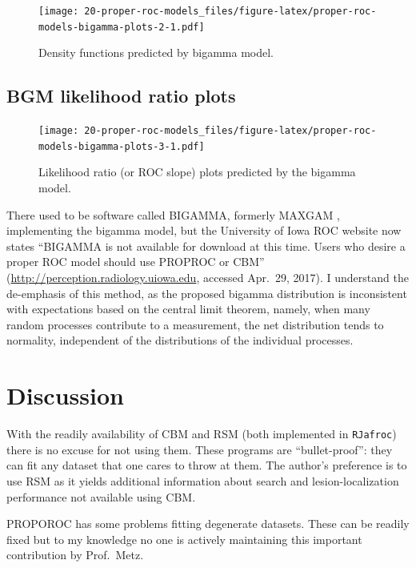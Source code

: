 \documentclass[
]{book}
\begin{document}
\begin{figure}
\centering
\texttt{[image: 20-proper-roc-models\_files/figure-latex/proper-roc-models-bigamma-plots-2-1.pdf]}
\caption{\label{fig:proper-roc-models-bigamma-plots-2}Density functions predicted by bigamma model.}
\end{figure}

\hypertarget{proper-roc-models-bigamma-slopes}{%
\subsection{BGM likelihood ratio plots}\label{proper-roc-models-bigamma-slopes}}

\begin{figure}
\centering
\texttt{[image: 20-proper-roc-models\_files/figure-latex/proper-roc-models-bigamma-plots-3-1.pdf]}
\caption{\label{fig:proper-roc-models-bigamma-plots-3}Likelihood ratio (or ROC slope) plots predicted by the bigamma model.}
\end{figure}

There used to be software called BIGAMMA, formerly MAXGAM \citep{dorfman1997proper}, implementing the bigamma model, but the University of Iowa ROC website now states ``BIGAMMA is not available for download at this time. Users who desire a proper ROC model should use PROPROC or CBM'' (\url{http://perception.radiology.uiowa.edu}, accessed Apr.~29, 2017). I understand the de-emphasis of this method, as the proposed bigamma distribution is inconsistent with expectations based on the central limit theorem, namely, when many random processes contribute to a measurement, the net distribution tends to normality, independent of the distributions of the individual processes.

\hypertarget{proper-roc-models-discussion}{%
\section{Discussion}\label{proper-roc-models-discussion}}

With the readily availability of CBM and RSM (both implemented in \texttt{RJafroc}) there is no excuse for not using them. These programs are ``bullet-proof'': they can fit any dataset that one cares to throw at them. The author's preference is to use RSM as it yields additional information about search and lesion-localization performance not available using CBM.

PROPOROC has some problems fitting degenerate datasets. These can be readily fixed but to my knowledge no one is actively maintaining this important contribution by Prof.~Metz.

  
\end{document}
